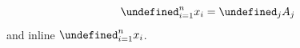 \documentclass{article}
\let\sum\undefined \DeclareMathSymbol{\sum}{\mathop}{largesymbolsX}{"50}
\let\bigcup\undefined \DeclareMathSymbol{\bigcup}{\mathop}{largesymbolsX}{"53}
\begin{document}
\[\sum_{i=1}^n x_i = \bigcup_{j} A_j\]
and inline \(\sum_{i=1}^n x_i\).
\end{document}
